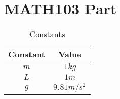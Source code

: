 \chapter{MATH103 Part}

\begin{table}[h]
    \centering
    \begin{tabular}{|c|c|}
        \hline
        Constant & Value \\
        \hline
        $m$ & $1kg$ \\
        $L$ & $1m$ \\
        $g$ & $9.81m/s^2$ \\
        \hline
    \end{tabular}
    \caption{Constants}
\end{table}



\newpage
\pagestyle{plain}


